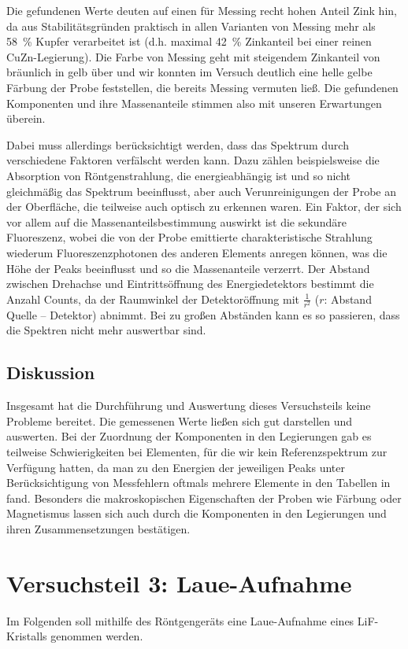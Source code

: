 \documentclass[11pt, a4paper]{article}
\begin{document}
Die gefundenen Werte deuten auf einen für Messing recht hohen Anteil Zink hin, da aus Stabilitätsgründen praktisch in allen Varianten von Messing mehr als \SI{58}{\percent} Kupfer verarbeitet ist (d.h. maximal \SI{42}{\percent} Zinkanteil bei einer reinen CuZn-Legierung).
Die Farbe von Messing geht mit steigendem Zinkanteil von bräunlich in gelb über und wir konnten im Versuch deutlich eine helle gelbe Färbung der Probe feststellen, die bereits Messing vermuten ließ.
Die gefundenen Komponenten und ihre Massenanteile stimmen also mit unseren Erwartungen überein.

Dabei muss allerdings berücksichtigt werden, dass das Spektrum durch verschiedene Faktoren verfälscht werden kann.
Dazu zählen beispielsweise die Absorption von Röntgenstrahlung, die energieabhängig ist und so nicht gleichmäßig das Spektrum beeinflusst, aber auch Verunreinigungen der Probe an der Oberfläche, die teilweise auch optisch zu erkennen waren.
Ein Faktor, der sich vor allem auf die Massenanteilsbestimmung auswirkt ist die sekundäre Fluoreszenz, wobei die von der Probe emittierte charakteristische Strahlung wiederum Fluoreszenzphotonen des anderen Elements anregen können, was die Höhe der Peaks beeinflusst und so die Massenanteile verzerrt.
Der Abstand zwischen Drehachse und Eintrittsöffnung des Energiedetektors bestimmt die Anzahl Counts, da der Raumwinkel der Detektoröffnung mit $\frac{1}{r^2}$ ($r$: Abstand Quelle -- Detektor) abnimmt.
Bei zu großen Abständen kann es so passieren, dass die Spektren nicht mehr auswertbar sind. 

\subsection{Diskussion}

Insgesamt hat die Durchführung und Auswertung dieses Versuchsteils keine Probleme bereitet.
Die gemessenen Werte ließen sich gut darstellen und auswerten.
Bei der Zuordnung der Komponenten in den Legierungen gab es teilweise Schwierigkeiten bei Elementen, für die wir kein Referenzspektrum zur Verfügung hatten, da man zu den Energien der jeweiligen Peaks unter Berücksichtigung von Messfehlern oftmals mehrere Elemente in den Tabellen in \cite{booklet} fand.
Besonders die makroskopischen Eigenschaften der Proben wie Färbung oder Magnetismus lassen sich auch durch die Komponenten in den Legierungen und ihren Zusammensetzungen bestätigen.

\section{Versuchsteil 3: Laue-Aufnahme}
Im Folgenden soll mithilfe des Röntgengeräts eine Laue-Aufnahme eines LiF-Kristalls genommen werden.
\end{document}

